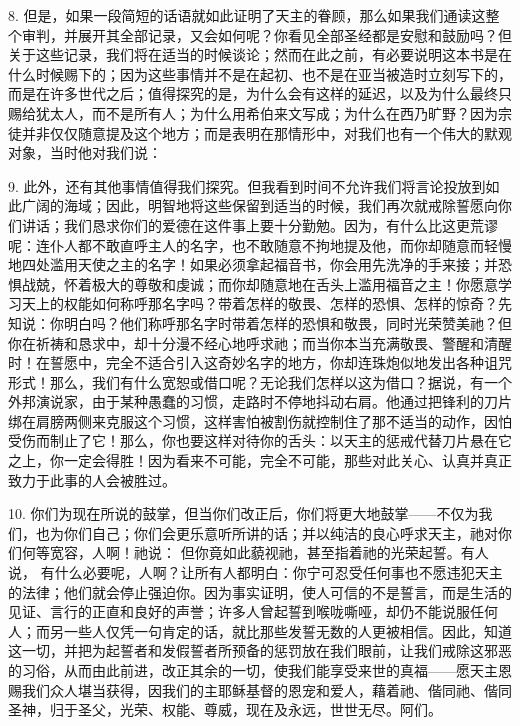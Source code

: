 8. 但是，如果一段简短的话语就如此证明了天主的眷顾，那么如果我们通读这整个审判，并展开其全部记录，又会如何呢？你看见全部圣经都是安慰和鼓励吗？但关于这些记录，我们将在适当的时候谈论；然而在此之前，有必要说明这本书是在什么时候赐下的；因为这些事情并不是在起初、也不是在亚当被造时立刻写下的，而是在许多世代之后；值得探究的是，为什么会有这样的延迟，以及为什么最终只赐给犹太人，而不是所有人；为什么用希伯来文写成；为什么在西乃旷野？因为宗徒并非仅仅随意提及这个地方；而是表明在那情形中，对我们也有一个伟大的默观对象，当时他对我们说：\par

9. 此外，还有其他事情值得我们探究。但我看到时间不允许我们将言论投放到如此广阔的海域；因此，明智地将这些保留到适当的时候，我们再次就戒除誓愿向你们讲话；我们恳求你们的爱德在这件事上要十分勤勉。因为，有什么比这更荒谬呢：连仆人都不敢直呼主人的名字，也不敢随意不拘地提及他，而你却随意而轻慢地四处滥用天使之主的名字！如果必须拿起福音书，你会用先洗净的手来接；并恐惧战兢，怀着极大的尊敬和虔诚；而你却随意地在舌头上滥用福音之主！你愿意学习天上的权能如何称呼那名字吗？带着怎样的敬畏、怎样的恐惧、怎样的惊奇？先知说：你明白吗？他们称呼那名字时带着怎样的恐惧和敬畏，同时光荣赞美祂？但你在祈祷和恳求中，却十分漫不经心地呼求祂；而当你本当充满敬畏、警醒和清醒时！在誓愿中，完全不适合引入这奇妙名字的地方，你却连珠炮似地发出各种诅咒形式！那么，我们有什么宽恕或借口呢？无论我们怎样以这为借口？据说，有一个外邦演说家，由于某种愚蠢的习惯，走路时不停地抖动右肩。他通过把锋利的刀片绑在肩膀两侧来克服这个习惯，这样害怕被割伤就控制住了那不适当的动作，因怕受伤而制止了它！那么，你也要这样对待你的舌头：以天主的惩戒代替刀片悬在它之上，你一定会得胜！因为看来不可能，完全不可能，那些对此关心、认真并真正致力于此事的人会被胜过。\par

10. 你们为现在所说的鼓掌，但当你们改正后，你们将更大地鼓掌——不仅为我们，也为你们自己；你们会更乐意听所讲的话；并以纯洁的良心呼求天主，祂对你们何等宽容，人啊！祂说：  但你竟如此藐视祂，甚至指着祂的光荣起誓。有人说， 有什么必要呢，人啊？让所有人都明白：你宁可忍受任何事也不愿违犯天主的法律；他们就会停止强迫你。因为事实证明，使人可信的不是誓言，而是生活的见证、言行的正直和良好的声誉；许多人曾起誓到喉咙嘶哑，却仍不能说服任何人；而另一些人仅凭一句肯定的话，就比那些发誓无数的人更被相信。因此，知道这一切，并把为起誓者和发假誓者所预备的惩罚放在我们眼前，让我们戒除这邪恶的习俗，从而由此前进，改正其余的一切，使我们能享受来世的真福——愿天主恩赐我们众人堪当获得，因我们的主耶稣基督的恩宠和爱人，藉着祂、偕同祂、偕同圣神，归于圣父，光荣、权能、尊威，现在及永远，世世无尽。阿们。\par

